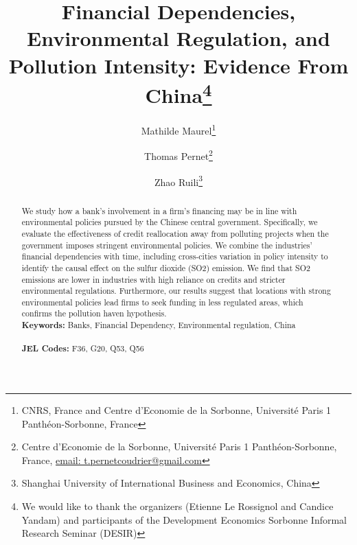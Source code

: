 \documentclass[12pt]{article}
\begin{document}
\begin{titlepage}

\title{Financial Dependencies, Environmental Regulation, and Pollution Intensity: Evidence From China\thanks{We would like to thank the organizers (Etienne Le Rossignol and Candice Yandam) and participants of the Development Economics Sorbonne Informal Research Seminar (DESIR)}}
\author{
Mathilde Maurel\thanks{CNRS, France and Centre d'Economie de la Sorbonne, Université Paris 1 Panthéon-Sorbonne, France} 
\and Thomas Pernet\thanks{Centre d'Economie de la Sorbonne, Université Paris 1 Panthéon-Sorbonne, France,
\href{mailto:t.pernetcoudrier@gmail.com}{email: t.pernetcoudrier@gmail.com} 
}
\and Zhao Ruili\thanks{Shanghai University of International Business and Economics, China}
}

\date{}

\maketitle
\begin{abstract}
\noindent We study how a bank’s involvement in a firm's financing may be in line with environmental policies pursued by the Chinese central government. Specifically, we evaluate the effectiveness of credit reallocation away from polluting projects when the government imposes stringent environmental policies. We combine the industries' financial dependencies with time, including cross-cities variation in policy intensity to identify the causal effect on the sulfur dioxide (SO2) emission. We find that SO2 emissions are lower in industries with high reliance on credits and stricter environmental regulations. Furthermore, our results suggest that locations with strong environmental policies lead firms to seek funding in less regulated areas, which confirms the pollution haven hypothesis.
\vspace{0em}\\
\noindent\textbf{Keywords:} Banks, Financial Dependency, Environmental regulation, China\\
\vspace{0em}\\
\noindent\textbf{JEL Codes:} F36, G20, Q53, Q56\\

\bigskip
\end{abstract}
\setcounter{page}{0}
\thispagestyle{empty}
\end{titlepage}
\pagebreak \newpage
\end{document}
